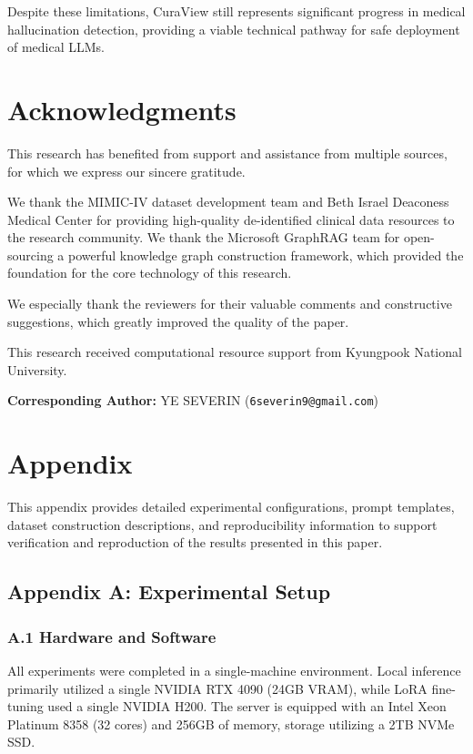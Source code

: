 \documentclass[11pt]{article}
\begin{document}
Despite these limitations, CuraView still represents significant progress in medical hallucination detection, providing a viable technical pathway for safe deployment of medical LLMs.

\section{Acknowledgments}
This research has benefited from support and assistance from multiple sources, for which we express our sincere gratitude.

We thank the MIMIC-IV dataset development team and Beth Israel Deaconess Medical Center for providing high-quality de-identified clinical data resources to the research community. We thank the Microsoft GraphRAG team for open-sourcing a powerful knowledge graph construction framework, which provided the foundation for the core technology of this research.

We especially thank the reviewers for their valuable comments and constructive suggestions, which greatly improved the quality of the paper.

This research received computational resource support from Kyungpook National University.

\textbf{Corresponding Author:} YE SEVERIN (\texttt{6severin9@gmail.com})

\section{Appendix}
This appendix provides detailed experimental configurations, prompt templates, dataset construction descriptions, and reproducibility information to support verification and reproduction of the results presented in this paper.

\subsection{Appendix A: Experimental Setup}

\subsubsection{A.1 Hardware and Software}

All experiments were completed in a single-machine environment. Local inference primarily utilized a single NVIDIA RTX 4090 (24GB VRAM), while LoRA fine-tuning used a single NVIDIA H200. The server is equipped with an Intel Xeon Platinum 8358 (32 cores) and 256GB of memory, storage utilizing a 2TB NVMe SSD.
\end{document}
